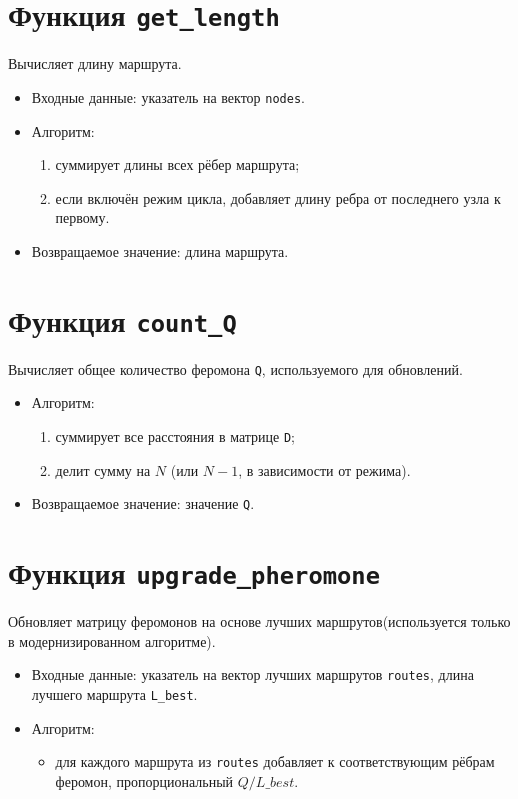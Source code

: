 \section*{Функция \texttt{get\_length}}
Вычисляет длину маршрута.
\begin{itemize}
	\item Входные данные: указатель на вектор \texttt{nodes}.
	\item Алгоритм:
	\begin{enumerate}
		\item суммирует длины всех рёбер маршрута;
		\item если включён режим цикла, добавляет длину ребра от последнего узла к первому.
	\end{enumerate}
	\item Возвращаемое значение: длина маршрута.
\end{itemize}

\section*{Функция \texttt{count\_Q}}
Вычисляет общее количество феромона \texttt{Q}, используемого для обновлений.
\begin{itemize}
	\item Алгоритм:
	\begin{enumerate}
		\item суммирует все расстояния в матрице \texttt{D};
		\item делит сумму на $N$ (или $N-1$, в зависимости от режима).
	\end{enumerate}
	\item Возвращаемое значение: значение \texttt{Q}.
\end{itemize}

\section*{Функция \texttt{upgrade\_pheromone}}
Обновляет матрицу феромонов на основе лучших маршрутов(используется только в модернизированном алгоритме).
\begin{itemize}
	\item Входные данные: указатель на вектор лучших маршрутов \texttt{routes}, длина лучшего маршрута \texttt{L\_best}.
	\item Алгоритм:
	\begin{itemize}
		\item для каждого маршрута из \texttt{routes} добавляет к соответствующим рёбрам феромон, пропорциональный $Q / L\_best$.
	\end{itemize}
\end{itemize}

\clearpage
